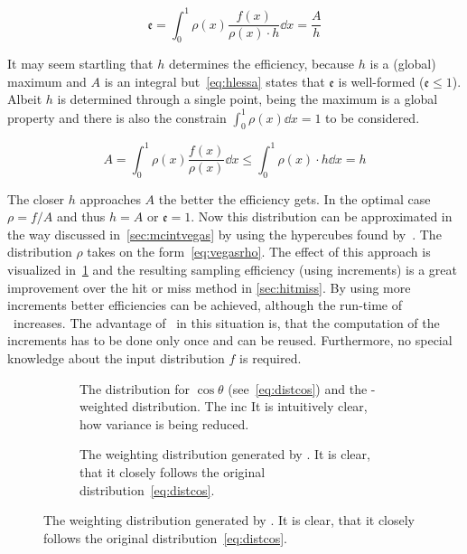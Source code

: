 \begin{equation}
  \label{eq:strateff}
  \mathfrak{e} = \int_0^1\rho(x)\frac{f(x)}{\rho(x)\cdot h}\dd{x} = \frac{A}{h}
\end{equation}

It may seem startling that \(h\) determines the efficiency, because
\(h\) is a (global) maximum and \(A\) is an integral
but~\eqref{eq:hlessa} states that \(\mathfrak{e}\) is well-formed
(\(\mathfrak{e}\leq 1\)). Albeit \(h\) is determined through a single
point, being the maximum is a global property and there is also the
constrain \(\int_0^1\rho(x)\dd{x}=1\) to be considered.

\begin{equation}
  \label{eq:hlessa}
  A = \int_0^1\rho(x)\frac{f(x)}{\rho(x)}\dd{x} \leq
  \int_0^1\rho(x)\cdot h\dd{x} = h
\end{equation}


The closer \(h\) approaches \(A\) the better the efficiency gets. In
the optimal case \(\rho=f/A\) and thus \(h=A\) or
\(\mathfrak{e} = 1\). Now this distribution can be approximated in the
way discussed in~\ref{sec:mcintvegas} by using the hypercubes found
by~\vegas. The distribution \(\rho\) takes on the
form~\eqref{eq:vegasrho}. The effect of this approach is visualized
in~\ref{fig:vegasdist} and the resulting sampling efficiency
 (using
 increments) is a great
improvement over the hit or miss method in \ref{sec:hitmiss}. By using
more increments better efficiencies can be achieved, although the
run-time of \vegas\ increases. The advantage of \vegas\ in this
situation is, that the computation of the increments has to be done
only once and can be reused. Furthermore, no special knowledge about
the input distribution \(f\) is required.


\begin{figure}[ht]
  \centering
  \begin{subfigure}{.49\textwidth}
    \caption[The distribution for \(\cos\theta\), derived from the
    differential cross-section and the \vegas-weighted
    distribution]{\label{fig:vegasdist} The distribution for
      \(\cos\theta\) (see~\eqref{eq:distcos}) and the \vegas-weighted
      distribution. The inc It is intuitively clear, how variance is
      being reduced.}
  \end{subfigure}
  \begin{subfigure}{.49\textwidth}
    \caption[The weighting distribution generated by
    \vegas.]{\label{fig:vegasrho} The weighting distribution generated by
    \vegas. It is clear, that it closely follows the original
    distribution~\eqref{eq:distcos}.}
  \end{subfigure}
\end{figure}


